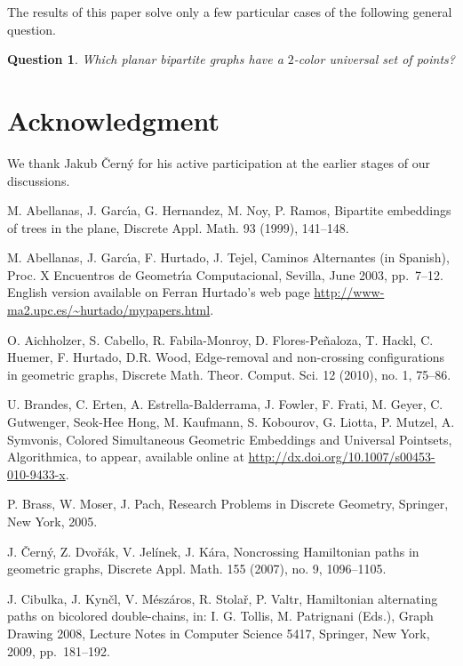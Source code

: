 \documentclass[12pt]{article}
\newtheorem*{question}{Question}
\begin{document}
The results of this paper solve only a few particular cases of the following general question.
\begin{question}
Which planar bipartite graphs have a $2$-color universal set of points?
\end{question}


\section*{Acknowledgment} We thank Jakub \v{C}ern\'y for his active participation at
the earlier stages of our discussions.


\begin{thebibliography}{ABC}

M. Abellanas, J. Garc{\'\i}a, G. Hernandez, M. Noy, P. Ramos, 
Bipartite embeddings of trees in the plane, 
Discrete Appl. Math. 93 (1999), 141--148.

M. Abellanas, J. Garc{\'\i}a, F. Hurtado, J. Tejel, Caminos Alternantes (in Spanish),
Proc. X Encuentros de Geometr{\'\i}a Computacional, Sevilla, June 2003, pp.\ 7--12. English version
available on Ferran Hurtado's web page \url{http://www-ma2.upc.es/~hurtado/mypapers.html}.

O. Aichholzer, S. Cabello, R. Fabila-Monroy, D. Flores-Pe\~{n}aloza, T. Hackl, C. Huemer, F. Hurtado, D.R. Wood,
Edge-removal and non-crossing configurations in geometric graphs,
Discrete Math. Theor. Comput. Sci. 12 (2010), no. 1, 75--86.

U. Brandes, C. Erten, A. Estrella-Balderrama, J. Fowler, F. Frati, M. Geyer, C. Gutwenger, Seok-Hee Hong, M. Kaufmann,
S. Kobourov, G. Liotta, P. Mutzel, A. Symvonis,
Colored Simultaneous Geometric Embeddings and Universal Pointsets,
Algorithmica, to appear, available online at \url{http://dx.doi.org/10.1007/s00453-010-9433-x}.


P. Brass, W. Moser, J. Pach, Research Problems in Discrete Geometry,
Springer, New York, 2005.

J. \v{C}ern\'y, Z. Dvo\v{r}\'ak, V. Jel\'inek, J. K\'ara,
Noncrossing Hamiltonian paths in geometric graphs,
Discrete Appl. Math. 155 (2007), no. 9, 1096--1105.

J. Cibulka, J. Kyn\v{c}l, V. M\'{e}sz\'{a}ros, R. Stola\v{r}, P. Valtr,  
Hamiltonian alternating paths on bicolored double-chains,
in: I. G. Tollis, M. Patrignani (Eds.), Graph Drawing 2008, Lecture Notes in Computer Science 5417,
Springer, New York, 2009, pp.\ 181--192.


\end{thebibliography}
\end{document}
